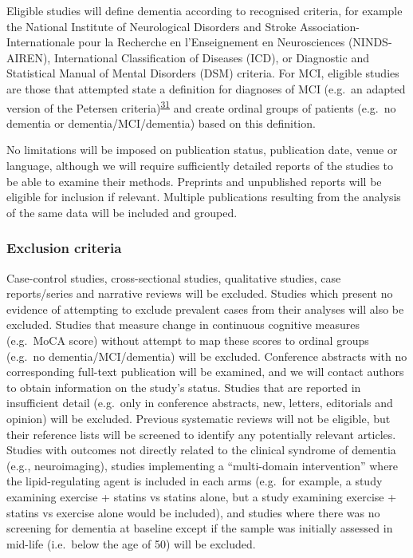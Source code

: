 \documentclass[a4paper, twoside]{templates/ociamthesis}
\begin{document}
Eligible studies will define dementia according to recognised criteria, for example the National Institute of Neurological Disorders and Stroke Association-Internationale pour la Recherche en l'Enseignement en Neurosciences (NINDS-AIREN), International Classification of Diseases (ICD), or Diagnostic and Statistical Manual of Mental Disorders (DSM) criteria. For MCI, eligible studies are those that attempted state a definition for diagnoses of MCI (e.g.~an adapted version of the Petersen criteria)\textsuperscript{\protect\hyperlink{ref-petersen1999}{31}} and create ordinal groups of patients (e.g.~no dementia or dementia/MCI/dementia) based on this definition.

No limitations will be imposed on publication status, publication date, venue or language, although we will require sufficiently detailed reports of the studies to be able to examine their methods. Preprints and unpublished reports will be eligible for inclusion if relevant. Multiple publications resulting from the analysis of the same data will be included and grouped.

\hypertarget{exclusion-criteria}{%
\subsubsection{Exclusion criteria}\label{exclusion-criteria}}

Case-control studies, cross-sectional studies, qualitative studies, case reports/series and narrative reviews will be excluded. Studies which present no evidence of attempting to exclude prevalent cases from their analyses will also be excluded. Studies that measure change in continuous cognitive measures (e.g.~MoCA score) without attempt to map these scores to ordinal groups (e.g.~no dementia/MCI/dementia) will be excluded. Conference abstracts with no corresponding full-text publication will be examined, and we will contact authors to obtain information on the study's status. Studies that are reported in insufficient detail (e.g.~only in conference abstracts, new, letters, editorials and opinion) will be excluded. Previous systematic reviews will not be eligible, but their reference lists will be screened to identify any potentially relevant articles. Studies with outcomes not directly related to the clinical syndrome of dementia (e.g., neuroimaging), studies implementing a ``multi-domain intervention'' where the lipid-regulating agent is included in each arms (e.g.~for example, a study examining exercise + statins vs statins alone, but a study examining exercise + statins vs exercise alone would be included), and studies where there was no screening for dementia at baseline except if the sample was initially assessed in mid-life (i.e.~below the age of 50) will be excluded.
\end{document}
